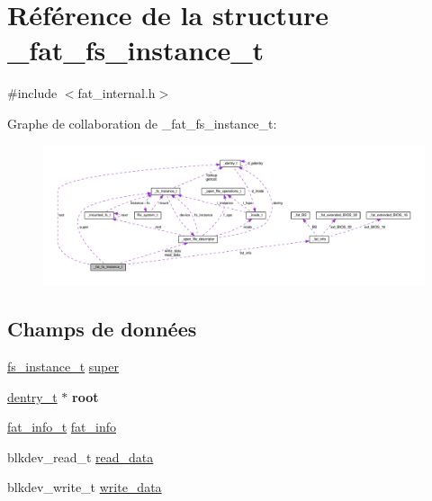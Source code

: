 \hypertarget{struct__fat__fs__instance__t}{\section{Référence de la structure \+\_\+fat\+\_\+fs\+\_\+instance\+\_\+t}
\label{struct__fat__fs__instance__t}
}


{\ttfamily \#include $<$fat\+\_\+internal.\+h$>$}



Graphe de collaboration de \+\_\+fat\+\_\+fs\+\_\+instance\+\_\+t\+:
\nopagebreak
\begin{figure}[H]
\begin{center}
\leavevmode
\includegraphics[width=350pt]{struct__fat__fs__instance__t__coll__graph}
\end{center}
\end{figure}
\subsection*{Champs de données}
\begin{DoxyCompactItemize}
\item 
\hyperlink{vfs_8h_a0eefa9aac35a5462ebf1e038992ca860}{fs\+\_\+instance\+\_\+t} \hyperlink{struct__fat__fs__instance__t_ac50318180f107a1950961c404ec6fd6d}{super}
\item 
\hypertarget{struct__fat__fs__instance__t_a209928b7f7db95270001a2eb47db4313}{\hyperlink{vfs_8h_ade5c998c6b3f09d2cf45d0e5ef8787da}{dentry\+\_\+t} $\ast$ {\bfseries root}}\label{struct__fat__fs__instance__t_a209928b7f7db95270001a2eb47db4313}

\item 
\hyperlink{fat__internal_8h_a1921d26ef987e5498294fe311a23c62f}{fat\+\_\+info\+\_\+t} \hyperlink{struct__fat__fs__instance__t_acebada58b620f950c9ef3c454db812fc}{fat\+\_\+info}
\item 
blkdev\+\_\+read\+\_\+t \hyperlink{struct__fat__fs__instance__t_adfdb319d2d87dc55a678366740a2bba9}{read\+\_\+data}
\item 
blkdev\+\_\+write\+\_\+t \hyperlink{struct__fat__fs__instance__t_a3056aeef9254049e772d6475510b0957}{write\+\_\+data}
\end{DoxyCompactItemize}


